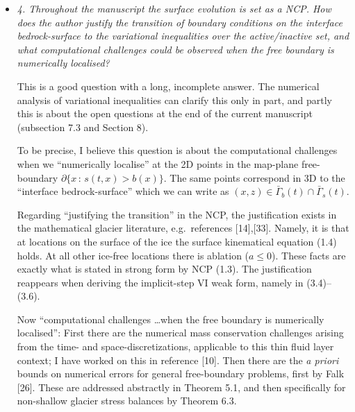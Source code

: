 \documentclass[11pt,reqno]{amsart}
\newcommand{\reply}[2]{%
\medskip
\item \emph{#1}

\medskip
\noindent #2
}
\begin{document}
\begin{itemize}[itemindent=0mm, labelsep=5mm]
\reply{4. Throughout the manuscript the surface evolution is set as a NCP. How does the author justify the transition of boundary conditions on the interface bedrock-surface to the variational
inequalities over the active/inactive set, and what computational challenges could be observed
when the free boundary is numerically localised?}
{This is a good question with a long, incomplete answer.  The numerical analysis of variational inequalities can clarify this only in part, and partly this is about the open questions at the end of the current manuscript (subsection 7.3 and Section 8). \par
To be precise, I believe this question is about the computational challenges when we ``numerically localise'' at the 2D points in the map-plane free-boundary $\partial\{x\,:\,s(t,x)>b(x)\}$.  The same points correspond in 3D to the ``interface bedrock-surface'' which we can write as $(x,z) \in \bar\Gamma_b(t)\cap \bar\Gamma_s(t)$. \par
Regarding ``justifying the transition'' in the NCP, the justification exists in the mathematical glacier literature, e.g.~references [14],[33].  Namely, it is that at locations on the surface of the ice the surface kinematical equation (1.4) holds.  At all other ice-free locations there is ablation ($a\le 0$).  These facts are exactly what is stated in strong form by NCP (1.3).  The justification reappears when deriving the implicit-step VI weak form, namely in (3.4)--(3.6). \par
Now ``computational challenges \dots when the free boundary is numerically localised'':  First there are the numerical mass conservation challenges arising from the time- and space-discretizations, applicable to this thin fluid layer context; I have worked on this in reference [10].  Then there are the \emph{a priori} bounds on numerical errors for general free-boundary problems, first by Falk [26].  These are addressed abstractly in Theorem 5.1, and then specifically for non-shallow glacier stress balances by Theorem 6.3. \par
}
\end{itemize}
\end{document}

